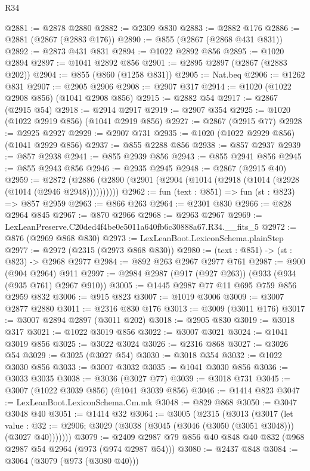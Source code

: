 \begin{lexlean}{R34}
\begin{coremodule}
@2881 := @2878 @2880
@2882 := @2309 @830
@2883 := @2882 @176
@2886 := @2881 (@2867 (@2883 @176))
@2890 := @855 (@2867 (@2868 @431 @831))
@2892 := @2873 @431 @831
@2894 := @1022 @2892 @856
@2895 := @1020 @2894
@2897 := @1041 @2892 @856
@2901 := @2895 @2897 (@2867 (@2883 @202))
@2904 := @855 (@860 (@1258 @831))
@2905 := Nat.beq
@2906 := @1262 @831
@2907 := @2905 @2906
@2908 := @2907 @317
@2914 := @1020 (@1022 @2908 @856) (@1041 @2908 @856)
@2915 := @2882 @54
@2917 := @2867 (@2915 @54)
@2918 := @2914 @2917
@2919 := @2907 @354
@2925 := @1020 (@1022 @2919 @856) (@1041 @2919 @856)
@2927 := @2867 (@2915 @77)
@2928 := @2925 @2927
@2929 := @2907 @731
@2935 := @1020 (@1022 @2929 @856) (@1041 @2929 @856)
@2937 := @855 @2288 @856
@2938 := @857 @2937
@2939 := @857 @2938
@2941 := @855 @2939 @856
@2943 := @855 @2941 @856
@2945 := @855 @2943 @856
@2946 := @2935 @2945
@2948 := @2867 (@2915 @40)
@2959 := @2872 (@2886 (@2890 (@2901 (@2904 (@1014 (@2918 (@1014 (@2928 (@1014 (@2946 @2948))))))))))
@2962 := fun (text : @851) => fun (st : @823) => @857 @2959
@2963 := @866 @263
@2964 := @2301 @830
@2966 := @828 @2964 @845
@2967 := @870 @2966
@2968 := @2963 @2967
@2969 := LexLeanPreserve.C20ded4f4be0e5011a640fb6c30888a67.R34.__fits_5
@2972 := @876 (@2969 @868 @830)
@2973 := LexLeanBoot.LexiconSchema.plainStep
@2977 := @2972 (@2315 (@2973 @868 @830))
@2980 := (text : @851) -> (st : @823) -> @2968 @2977
@2984 := @892 @263 @2967 @2977 @761
@2987 := @900 (@904 @2964) @911
@2997 := @2984 @2987 (@917 (@927 @263)) (@933 (@934 (@935 @761) @2967 @910))
@3005 := @1445 @2987 @77 @11 @695 @759 @856 @2959 @832
@3006 := @915 @823
@3007 := @1019 @3006
@3009 := @3007 @2877 @2880
@3011 := @2316 @830 @176
@3013 := @3009 (@3011 @176)
@3017 := @3007 @2894 @2897 (@3011 @202)
@3018 := @2905 @830
@3019 := @3018 @317
@3021 := @1022 @3019 @856
@3022 := @3007 @3021
@3024 := @1041 @3019 @856
@3025 := @3022 @3024
@3026 := @2316 @868
@3027 := @3026 @54
@3029 := @3025 (@3027 @54)
@3030 := @3018 @354
@3032 := @1022 @3030 @856
@3033 := @3007 @3032
@3035 := @1041 @3030 @856
@3036 := @3033 @3035
@3038 := @3036 (@3027 @77)
@3039 := @3018 @731
@3045 := @3007 (@1022 @3039 @856) (@1041 @3039 @856)
@3046 := @1414 @823
@3047 := LexLeanBoot.LexiconSchema.Cm.mk
@3048 := @829 @868
@3050 := @3047 @3048 @40
@3051 := @1414 @32
@3064 := @3005
    (@2315
      (@3013
        (@3017
          (let value : @32 := @2906;
          @3029 (@3038 (@3045 (@3046 (@3050 (@3051 @3048))) (@3027 @40)))))))
@3079 := @2409 @2987 @79 @856 @40 @848 @40 @832 (@968 @2987 @54 @2964 (@973 (@974 @2987 @54)))
@3080 := @2437 @848
@3084 := @3064 (@3079 (@973 (@3080 @40)))

\end{coremodule}
\end{lexlean}
